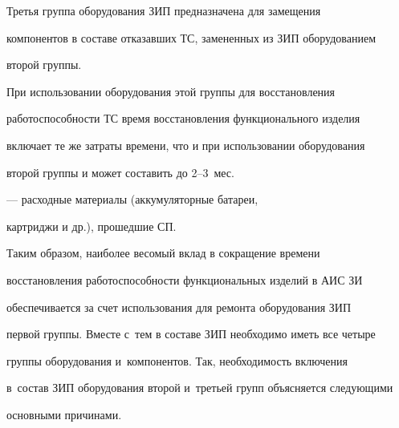 \begin{description}
     Третья группа оборудования ЗИП предназначена для замещения

компонентов в составе отказавших ТС, замененных из ЗИП оборудованием

второй группы.



     При использовании оборудования этой группы для восстановления

работоспособности ТС время восстановления функционального изделия

включает те же затраты времени, что и при использовании оборудования

второй группы и может составить до 2--3~мес.



\item[Группа 4] --- расходные материалы (аккумуляторные батареи,

картриджи и др.), прошедшие СП.

\end{description}



     Таким образом, наиболее весомый вклад в сокращение времени

восстановления работоспособности функциональных изделий в АИС ЗИ

обеспечивается за счет использования для ремонта оборудования ЗИП

первой группы. Вместе с~тем в составе ЗИП необходимо иметь все четыре

группы оборудования и~компонентов. Так, необходимость включения

в~со\-став ЗИП оборудования второй и~третьей групп объясняется следующими

основными причинами.

